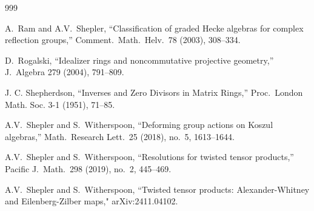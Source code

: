 \documentclass[11pt]{amsart}
\numberwithin{equation}{section}
\renewcommand{\_}[1]{\mbox{$_{\left( #1 \right)}$}}
\begin{document}
{\begin{thebibliography}{999}


 A.\ Ram and A.V.\ Shepler,
``Classification of graded Hecke algebras for complex reflection groups,''
Comment.\ Math.\ Helv.\ 78 (2003), 308--334.

  D.\ Rogalski,
  ``Idealizer rings and noncommutative projective geometry,''
  J.\ Algebra 279 (2004), 791--809.
  
  J. C. Shepherdson,
  ``Inverses and Zero Divisors in Matrix Rings,''
 Proc.\ London Math. Soc. 3-1 (1951), 71–85.






  A.V.\ Shepler and S.\ Witherspoon,
``Deforming group actions on Koszul algebras,''
Math.\ Research Lett.\ 25 (2018), no.\ 5, 1613--1644. 

 A.V.\ Shepler and S.\ Witherspoon,
``Resolutions for twisted tensor products,''
Pacific J.\ Math.\ 298 (2019), no.\ 2, 445--469. 


  A.V.\ Shepler and S.\ Witherspoon,
``Twisted tensor products: Alexander-Whitney and Eilenberg-Zilber maps,"
arXiv:2411.04102. 

  

\end{thebibliography}}
\end{document}
